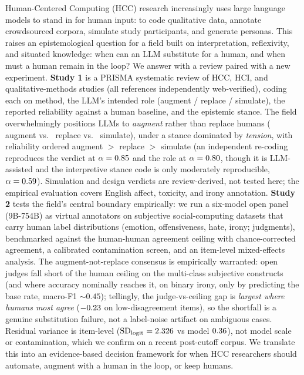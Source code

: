 \noindent
Human-Centered Computing (HCC) research increasingly uses large language models to stand in for human input: to
code qualitative data, annotate crowdsourced corpora, simulate study participants, and generate personas. This
raises an epistemological question for a field built on interpretation, reflexivity, and situated knowledge: when
can an LLM substitute for a human, and when must a human remain in the loop? We answer with a review paired with a
new experiment. \textbf{Study 1} is a PRISMA systematic review of \STN{} HCC, HCI, and qualitative-methods studies
(all references independently web-verified), coding each on method, the LLM's intended role
(augment / replace / simulate), the reported reliability against a human baseline, and the epistemic stance. The
field overwhelmingly positions LLMs to \emph{augment} rather than replace humans (\STaugment{} augment vs.\
\STreplace{} replace vs.\ \STsimulate{} simulate), under a stance dominated by \emph{tension}, with reliability
ordered augment $>$ replace $>$ simulate (an independent re-coding reproduces the verdict at $\alpha=0.85$ and the
role at $\alpha=0.80$, though it is LLM-assisted and the interpretive stance code is only moderately
reproducible, $\alpha=0.59$). Simulation and design verdicts are review-derived, not tested here; the
empirical evaluation covers English affect, toxicity, and irony annotation. \textbf{Study 2} tests the field's central boundary empirically: we run a
six-model open panel (9B-754B) as virtual annotators on \SOCndat{} subjective social-computing datasets that carry
human label distributions (emotion, offensiveness, hate, irony; \SOCnjudg{} judgments), benchmarked against the
human-human agreement ceiling with chance-corrected agreement, a calibrated contamination screen, and an item-level
mixed-effects analysis. The augment-not-replace consensus is empirically warranted: open judges fall short of the
human ceiling on the multi-class subjective constructs (and where accuracy nominally reaches it, on binary irony, only
by predicting the base rate, macro-F1 ${\sim}0.45$); tellingly, the judge-vs-ceiling gap is \emph{largest where humans
most agree} ($-0.23$ on low-disagreement items), so the shortfall is a genuine substitution failure, not a
label-noise artifact on ambiguous cases. Residual variance is item-level ($\mathrm{SD}_{\text{logit}}=
2.326$ vs model $0.36$), not model scale or contamination, which we confirm on a recent
post-cutoff corpus. We translate this into an evidence-based decision framework for when HCC researchers should
automate, augment with a human in the loop, or keep humans.
